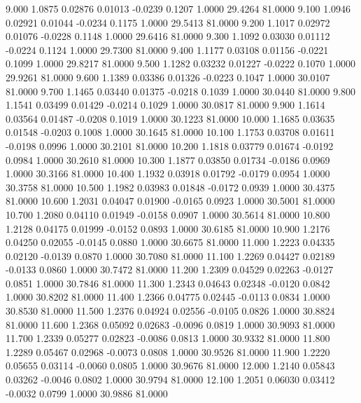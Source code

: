    9.000   1.0875   0.02876   0.01013  -0.0239   0.1207   1.0000  29.4264  81.0000
   9.100   1.0946   0.02921   0.01044  -0.0234   0.1175   1.0000  29.5413  81.0000
   9.200   1.1017   0.02972   0.01076  -0.0228   0.1148   1.0000  29.6416  81.0000
   9.300   1.1092   0.03030   0.01112  -0.0224   0.1124   1.0000  29.7300  81.0000
   9.400   1.1177   0.03108   0.01156  -0.0221   0.1099   1.0000  29.8217  81.0000
   9.500   1.1282   0.03232   0.01227  -0.0222   0.1070   1.0000  29.9261  81.0000
   9.600   1.1389   0.03386   0.01326  -0.0223   0.1047   1.0000  30.0107  81.0000
   9.700   1.1465   0.03440   0.01375  -0.0218   0.1039   1.0000  30.0440  81.0000
   9.800   1.1541   0.03499   0.01429  -0.0214   0.1029   1.0000  30.0817  81.0000
   9.900   1.1614   0.03564   0.01487  -0.0208   0.1019   1.0000  30.1223  81.0000
  10.000   1.1685   0.03635   0.01548  -0.0203   0.1008   1.0000  30.1645  81.0000
  10.100   1.1753   0.03708   0.01611  -0.0198   0.0996   1.0000  30.2101  81.0000
  10.200   1.1818   0.03779   0.01674  -0.0192   0.0984   1.0000  30.2610  81.0000
  10.300   1.1877   0.03850   0.01734  -0.0186   0.0969   1.0000  30.3166  81.0000
  10.400   1.1932   0.03918   0.01792  -0.0179   0.0954   1.0000  30.3758  81.0000
  10.500   1.1982   0.03983   0.01848  -0.0172   0.0939   1.0000  30.4375  81.0000
  10.600   1.2031   0.04047   0.01900  -0.0165   0.0923   1.0000  30.5001  81.0000
  10.700   1.2080   0.04110   0.01949  -0.0158   0.0907   1.0000  30.5614  81.0000
  10.800   1.2128   0.04175   0.01999  -0.0152   0.0893   1.0000  30.6185  81.0000
  10.900   1.2176   0.04250   0.02055  -0.0145   0.0880   1.0000  30.6675  81.0000
  11.000   1.2223   0.04335   0.02120  -0.0139   0.0870   1.0000  30.7080  81.0000
  11.100   1.2269   0.04427   0.02189  -0.0133   0.0860   1.0000  30.7472  81.0000
  11.200   1.2309   0.04529   0.02263  -0.0127   0.0851   1.0000  30.7846  81.0000
  11.300   1.2343   0.04643   0.02348  -0.0120   0.0842   1.0000  30.8202  81.0000
  11.400   1.2366   0.04775   0.02445  -0.0113   0.0834   1.0000  30.8530  81.0000
  11.500   1.2376   0.04924   0.02556  -0.0105   0.0826   1.0000  30.8824  81.0000
  11.600   1.2368   0.05092   0.02683  -0.0096   0.0819   1.0000  30.9093  81.0000
  11.700   1.2339   0.05277   0.02823  -0.0086   0.0813   1.0000  30.9332  81.0000
  11.800   1.2289   0.05467   0.02968  -0.0073   0.0808   1.0000  30.9526  81.0000
  11.900   1.2220   0.05655   0.03114  -0.0060   0.0805   1.0000  30.9676  81.0000
  12.000   1.2140   0.05843   0.03262  -0.0046   0.0802   1.0000  30.9794  81.0000
  12.100   1.2051   0.06030   0.03412  -0.0032   0.0799   1.0000  30.9886  81.0000
